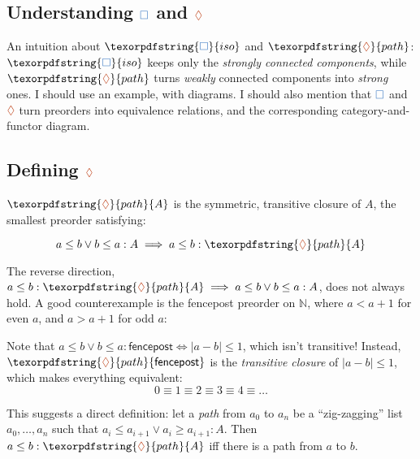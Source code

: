 \documentclass[ribbons]{rntz}
\newcommand{\todo}[1]{{\color{Purple}#1}}
\newcommand{\N}{\mathbb{N}}
\newcommand\isocolor{\color{NavyBlue}}
\newcommand\pathcolor{\color{Bittersweet}}
\newcommand\iso{\texorpdfstring{\ensuremath{{\isocolor\Box}}}{iso}}
\renewcommand\path{\texorpdfstring{\ensuremath{{\pathcolor\lozenge}}}{path}}
\newcommand\pathof{\path}
\begin{document}
\subsection{Understanding \iso{} and \path{}}

\todo{An intuition about $\iso$ and $\path$: $\iso$ keeps only the \emph{strongly
    connected components}, while $\path$ turns \emph{weakly} connected components
  into \emph{strong} ones. I should use an example, with diagrams. I should also
  mention that \iso{} and \path{} turn preorders into equivalence relations, and
  the corresponding cate\-gory-and-functor diagram.}

\subsection{Defining \path{}} \label{sec:defining-path}

$\pathof{A}$ is the symmetric, transitive closure of $A$, the smallest preorder
satisfying:

\[ a \le b \vee b \le a : A \implies a \le b : \pathof{A} \]

The reverse direction, $a \le b : \pathof{A} \implies a \le b \vee b \le a : A$,
does not always hold. A good counterexample is the \textsf{fencepost} preorder
on $\N$, where $a < a+1$ for even $a$, and $a > a+1$ for odd $a$:

\begin{center}
\end{center}

Note that $a \le b \vee b \le a : \textsf{fencepost} \iff |a-b| \le 1$, which
isn't transitive! Instead, $\pathof{\textsf{fencepost}}$ is the \emph{transitive
  closure} of $|a-b| \le 1$, which makes everything equivalent:
\[ 0 \equiv 1 \equiv 2 \equiv 3 \equiv 4 \equiv \dots \]

This suggests a direct definition: let a \emph{path} from $a_0$ to $a_n$ be a
``zig-zag\-ging'' list $a_0, \dots, a_n$ such that $a_i \le a_{i+1} \vee a_i \ge
a_{i+1} : A$. Then $a \le b : \pathof{A}$ iff there is a path from $a$ to $b$.
\end{document}
